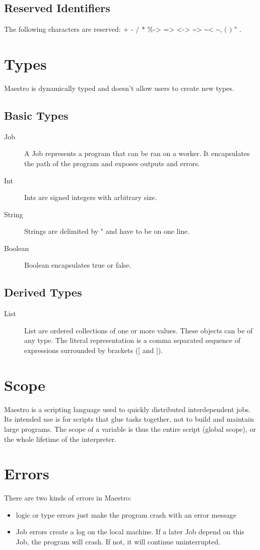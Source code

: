 \documentclass[12pt]{article}
\begin{document}
\subsection{Reserved Identifiers}
The following characters are reserved: $\texttt{+ - / * \% -> => <-> \textasciitilde>
\textasciitilde< \textasciitilde , ( ) " .}$

\section{Types}
Maestro is dynamically typed and doesn't allow users to create new types.
\subsection{Basic Types}
\begin{description}
  \item[Job] A Job represents a program that can be ran on a worker. It encapsulates
    the path of the program and exposes outputs and errors.
  \item[Int] Ints are signed integers with arbitrary size.
  \item[String] Strings are delimited by " and have to be on one line.
  \item[Boolean] Boolean encapsulates true or false.
\end{description}

\subsection{Derived Types}
\begin{description}
  \item[List] List are ordered collections of one or more values. These
    objects can be of any type. The literal representation is a
    comma separated sequence of expressions surrounded by brackets ([ and ]).
\end{description}

\section{Scope}
Maestro is a scripting language used to quickly distributed interdependent jobs.
Its intended use is for scripts that glue tasks together, not to build and
maintain large programs. The scope of a variable is thus the entire script
(global scope), or the whole lifetime of the interpreter.

\section{Errors}
There are two kinds of errors in Maestro:
\begin{itemize}
  \item logic or type errors just make the program crash with an error
  message
  \item Job errors create a log on the local machine. If a later Job depend
  on this Job, the program will crash. If not, it will continue uninterrupted.
\end{itemize}
\end{document}
